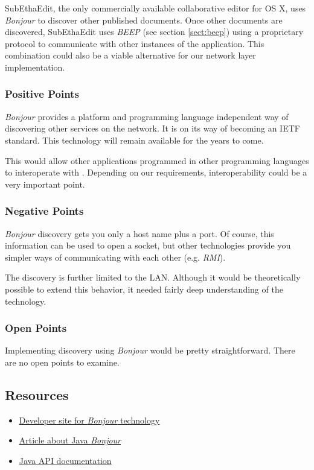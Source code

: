 SubEthaEdit, the only commercially available collaborative editor for OS X, uses \emph{Bonjour} to discover other published documents. Once other documents are discovered, SubEthaEdit uses \emph{BEEP} (see section \ref{sect:beep}) using a proprietary protocol to communicate with other instances of the application. This combination could also be a viable alternative for our network layer implementation.

\subsubsection{Positive Points}
\emph{Bonjour} provides a platform and programming language independent way of discovering other services on the network. It is on its way of becoming an IETF standard. This technology will remain available for the years to come.

This would allow other applications programmed in other programming languages to interoperate with \ace. Depending on our requirements, interoperability could be a very important point.

\subsubsection{Negative Points}
\emph{Bonjour} discovery gets you only a host name plus a port. Of course, this information can be used to open a socket, but other technologies provide you simpler ways of communicating with each other (e.g. \emph{RMI}).

The discovery is further limited to the LAN. Although it would be theoretically possible to extend this behavior, it needed fairly deep understanding of the technology.

\subsubsection{Open Points}
Implementing discovery using \emph{Bonjour} would be pretty straightforward. There are no open points to examine.


\subsection{Resources}
\begin{itemize}
 \item \href{http://developer.apple.com/darwin/projects/bonjour/}{Developer site for \emph{Bonjour} technology}
 \item \href{http://www.macdevcenter.com/pub/a/mac/2004/08/31/osx_java.html}{Article about Java \emph{Bonjour}}
 \item \href{http://developer.apple.com/documentation/Java/Reference/DNSServiceDiscovery_JavaRef/index.html}{Java API documentation}
\end{itemize}
